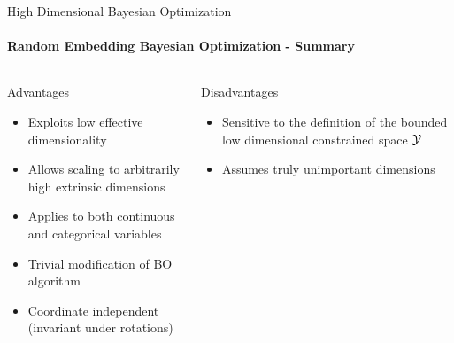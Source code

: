 \begin{frame}[c]{High Dimensional Bayesian Optimization}
\framesubtitle{Random Embedding Bayesian Optimization - Summary}
\begin{columns}[T] %
\begin{column}{.48\textwidth}


    \begin{block}{Advantages}
    \begin{itemize}
    	\item Exploits low effective dimensionality 
    	\item Allows scaling to arbitrarily high extrinsic dimensions
    	\item Applies to both continuous and categorical variables
    	\item Trivial modification of BO algorithm
    	\item Coordinate independent (invariant under rotations)
    \end{itemize}
    \end{block}
\pause
\end{column}%

\hfill%

\begin{column}{.48\textwidth}

    \begin{block}{Disadvantages}
    \begin{itemize}
    	\item Sensitive to the definition of the bounded low dimensional constrained space $\mathcal{Y}$
    	\item Assumes truly unimportant dimensions
    \end{itemize}
\end{block}

\end{column}
\end{columns}   
\end{frame}

